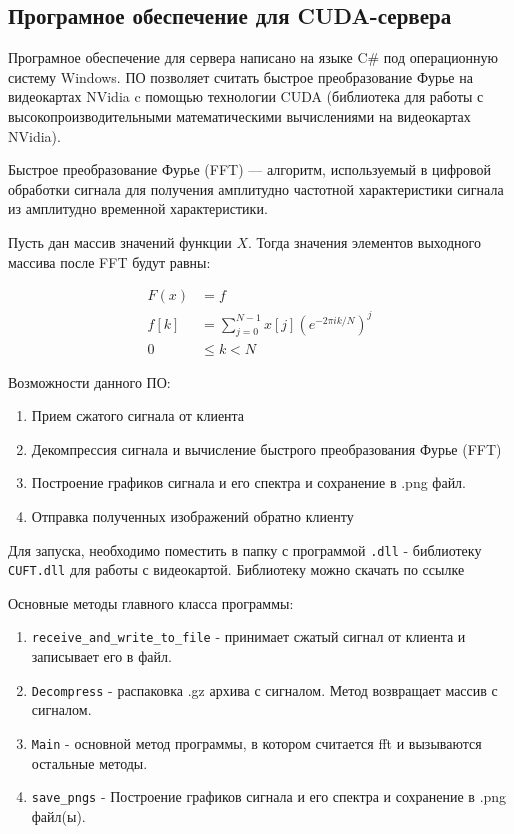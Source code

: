 \documentclass[../paper.tex]{subfiles}
\begin{document}
\subsection{Програмное обеспечение для CUDA-сервера}
Програмное обеспечение для сервера написано на языке C\# под операционную систему Windows. ПО позволяет считать быстрое преобразование Фурье на видеокартах NVidia c помощью технологии CUDA (библиотека для работы с высокопроизводительными математическими вычислениями на видеокартах NVidia).

Быстрое преобразование Фурье (FFT) — алгоритм, используемый в цифровой обработки сигнала для получения амплитудно частотной характеристики сигнала из амплитудно временной характеристики. 

Пусть дан массив значений функции $X$. Тогда значения элементов выходного массива после FFT будут равны:

\begin{align*}
F(x) &= f\\
f[k] &= \sum_{j=0}^{N-1} x[j]\left(e^{-2\pi i k/N}\right)^j\\
0 &\leq k < N
\end{align*}

Возможности данного ПО:
\begin{enumerate}
  \item Прием сжатого сигнала от клиента
  \item Декомпрессия сигнала и вычисление быстрого преобразования Фурье (FFT)
  \item Построение графиков сигнала и его спектра и сохранение в .png файл.
  \item Отправка полученных изображений обратно клиенту
\end{enumerate}

Для запуска, необходимо поместить в папку с программой \lstinline|.dll| - библиотеку \lstinline|CUFT.dll| для работы с видеокартой. Библиотеку можно скачать по ссылке \cite{сuft}

Основные методы главного класса программы:
\begin{enumerate}
  \item \lstinline|receive_and_write_to_file| - принимает сжатый сигнал от клиента и записывает его в файл.
  \item \lstinline|Decompress| - распаковка .gz архива с сигналом. Метод возвращает массив с сигналом.
  \item \lstinline|Main| - основной метод программы, в котором считается fft и вызываются остальные методы.
  \item \lstinline|save_pngs| - Построение графиков сигнала и его спектра и сохранение в .png файл(ы).
\end{enumerate}
\end{document}
